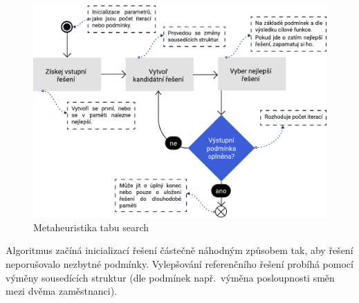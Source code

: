 \documentclass[twoside]{ctuthesis}
\begin{document}
\begin{figure}[h]
	\includegraphics[scale=0.7]{img/tabu-search.pdf}
	\caption{Metaheuristika tabu search}
	\label{fig:tabusearch}
\end{figure}

 Algoritmus začíná inicializací řešení částečně náhodným způsobem tak, aby řešení neporušovalo nezbytné podmínky. Vylepšování referenčního řešení probíhá pomocí výměny sousedících struktur (dle podmínek např.~výměna posloupnosti směn mezi dvěma zaměstnanci). \cite{ramli2020tabu}


\end{document}
